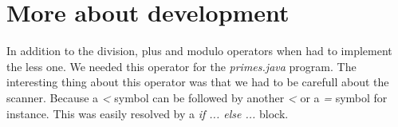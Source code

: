 \documentclass[10pt,a4paper]{article}
\begin{document}
\section{More about development}

In addition to the division, plus and modulo operators when had to implement the less one. We needed this operator for the \emph{primes.java} program. The interesting thing about this operator was that we had to be carefull about the scanner. Because a \emph{<} symbol can be followed by another \emph{<} or a \emph{=} symbol for instance. This was easily resolved by a \emph{if ... else ...} block.
\end{document}
